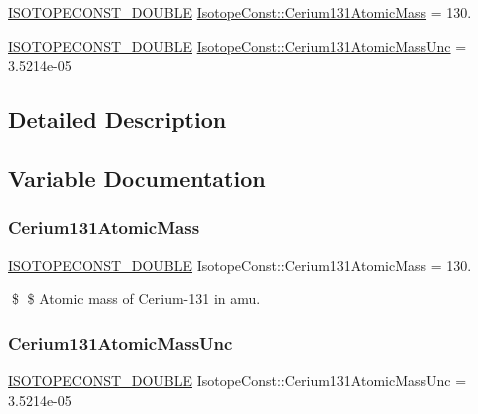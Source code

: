 \begin{DoxyCompactItemize}
\item 
\mbox{\hyperlink{group___isotope_const-_macros_ga8f45a7272ce02c0b4c65c44636ed719a}{I\+S\+O\+T\+O\+P\+E\+C\+O\+N\+S\+T\+\_\+\+D\+O\+U\+B\+LE}} \mbox{\hyperlink{group___isotope_const-_cerium-_ce131_gafb6dfafc1f28b3e2da5ba1e583f1dcd9}{Isotope\+Const\+::\+Cerium131\+Atomic\+Mass}} = 130.
\item 
\mbox{\hyperlink{group___isotope_const-_macros_ga8f45a7272ce02c0b4c65c44636ed719a}{I\+S\+O\+T\+O\+P\+E\+C\+O\+N\+S\+T\+\_\+\+D\+O\+U\+B\+LE}} \mbox{\hyperlink{group___isotope_const-_cerium-_ce131_ga5e79ed3eed5a40facb38fe3209bb45bf}{Isotope\+Const\+::\+Cerium131\+Atomic\+Mass\+Unc}} = 3.\+5214e-\/05
\end{DoxyCompactItemize}


\subsection{Detailed Description}


\subsection{Variable Documentation}
\mbox{\label{group___isotope_const-_cerium-_ce131_gafb6dfafc1f28b3e2da5ba1e583f1dcd9}} 
\subsubsection{\texorpdfstring{Cerium131\+Atomic\+Mass}{Cerium131AtomicMass}}
{\footnotesize\ttfamily \mbox{\hyperlink{group___isotope_const-_macros_ga8f45a7272ce02c0b4c65c44636ed719a}{I\+S\+O\+T\+O\+P\+E\+C\+O\+N\+S\+T\+\_\+\+D\+O\+U\+B\+LE}} Isotope\+Const\+::\+Cerium131\+Atomic\+Mass = 130.}

\$ \$ Atomic mass of Cerium-\/131 in amu. \mbox{\label{group___isotope_const-_cerium-_ce131_ga5e79ed3eed5a40facb38fe3209bb45bf}} 
\subsubsection{\texorpdfstring{Cerium131\+Atomic\+Mass\+Unc}{Cerium131AtomicMassUnc}}
{\footnotesize\ttfamily \mbox{\hyperlink{group___isotope_const-_macros_ga8f45a7272ce02c0b4c65c44636ed719a}{I\+S\+O\+T\+O\+P\+E\+C\+O\+N\+S\+T\+\_\+\+D\+O\+U\+B\+LE}} Isotope\+Const\+::\+Cerium131\+Atomic\+Mass\+Unc = 3.\+5214e-\/05}

